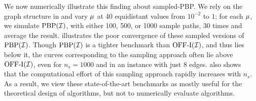 {We now numerically illustrate this finding about sampled-PBP. We rely on the graph structure in  and vary $\mu$ at 40 equidistant values from $10^{-2}$ to $1$; for each $\mu$, we simulate $\mathrm{PBP}(\mathcal I)$, with either 100, 500, or 1000 sample paths, 30 times and average the result. 
 illustrates the poor convergence of these sampled versions of $\mathrm{PBP}(\mathcal I)$. Though $ \mathrm{PBP}(\mathcal I) $ is a tighter benchmark than $ \mathrm{\mathrm{OFF}}\textrm{-}\mathrm{I}(\mathcal I) $, and thus lies below it, the curves corresponding to the sampling approach often lie above $ \mathrm{\mathrm{OFF}}\textrm{-}\mathrm{I}(\mathcal I) $, even for $n_s=1000$ and in an instance with just 8 edges. %
 also shows that the computational effort of this sampling approach rapidly increases with $n_s$. As a result, we view these state-of-the-art benchmarks as mostly useful for the theoretical design of algorithms, but not to numerically evaluate algorithms. 

}
